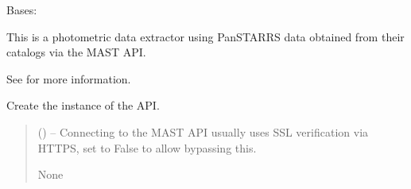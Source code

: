 \documentclass[letterpaper,11pt,english]{sphinxmanual}
\begin{document}
\begin{savenotes}\begin{fulllineitems}
\label{\detokenize{code/opihiexarata.photometry.panstarrs:opihiexarata.photometry.panstarrs.PanstarrsMastWebAPIEngine}}
\pysigstartsignatures
{}
\pysigstopsignatures
\sphinxAtStartPar
Bases: {\hyperref[\detokenize{code/opihiexarata.library.engine:opihiexarata.library.engine.PhotometryEngine}]{}}

\sphinxAtStartPar
This is a photometric data extractor using PanSTARRS data obtained from
their catalogs via the MAST API.

\sphinxAtStartPar
See  for more
information.

\begin{savenotes}\begin{fulllineitems}
\label{\detokenize{code/opihiexarata.photometry.panstarrs:opihiexarata.photometry.panstarrs.PanstarrsMastWebAPIEngine.__init__}}
\pysigstartsignatures
{}
\pysigstopsignatures
\sphinxAtStartPar
Create the instance of the API.
\begin{quote}\begin{description}
\sphinxAtStartPar
{} (\sphinxstyleliteralemphasis{\sphinxupquote{, }}) – Connecting to the MAST API usually uses SSL verification via HTTPS,
set to False to allow bypassing this.

\sphinxAtStartPar
None

\end{description}\end{quote}


\end{fulllineitems}
\end{savenotes}
\end{fulllineitems}
\end{savenotes}
\end{document}
